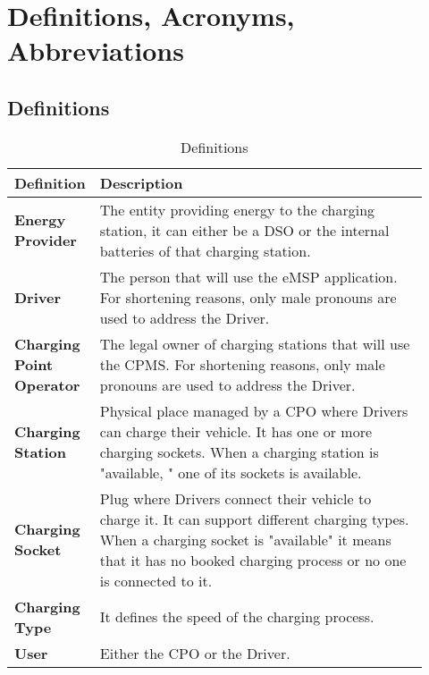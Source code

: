 \section{Definitions, Acronyms, Abbreviations}
\label{sec:definitionsAcronymsAbbreviations}
\subsection{Definitions} %
\label{subsec:definitions}
\begin{table}[H]
\centering 
    \begin{tabular}{| p{0.125\linewidth} | p{0.80\linewidth} |}
    \hline
    \rowcolor{bluepoli!40}
     \textbf{Definition} & \textbf{Description} \T\B \\
    \hline \hline
    \textbf{Energy Provider} & The entity providing energy to the charging station, it can either be a DSO or the internal batteries of that charging station.\T\B\\
    \hline
    \textbf{Driver} & The person that will use the eMSP application. For shortening reasons, only male pronouns are used to address the Driver. \T\B\\
    \hline
    \textbf{Charging Point Operator} & The legal owner of charging stations that will use the CPMS. For shortening reasons, only male pronouns are used to address the Driver. \T\B\\
    \hline
    \textbf{Charging Station} & Physical place managed by a CPO where Drivers can charge their vehicle. It has one or more charging sockets. When a charging station is "available, " one of its sockets is available. \T\B\\
    \hline
    \textbf{Charging Socket} & Plug where Drivers connect their vehicle to charge it. It can support different charging types. When a charging socket is "available" it means that it has no booked charging process  or no one is connected to it.\T\B\\
    \hline
    \textbf{Charging Type} & It defines the speed of the charging process.\T\B\\
    \hline
    \textbf{User} & Either the CPO or the Driver.\T\B\\
    \hline
    
    \end{tabular}
    \\[10pt]
    \caption{Definitions}
\end{table}

